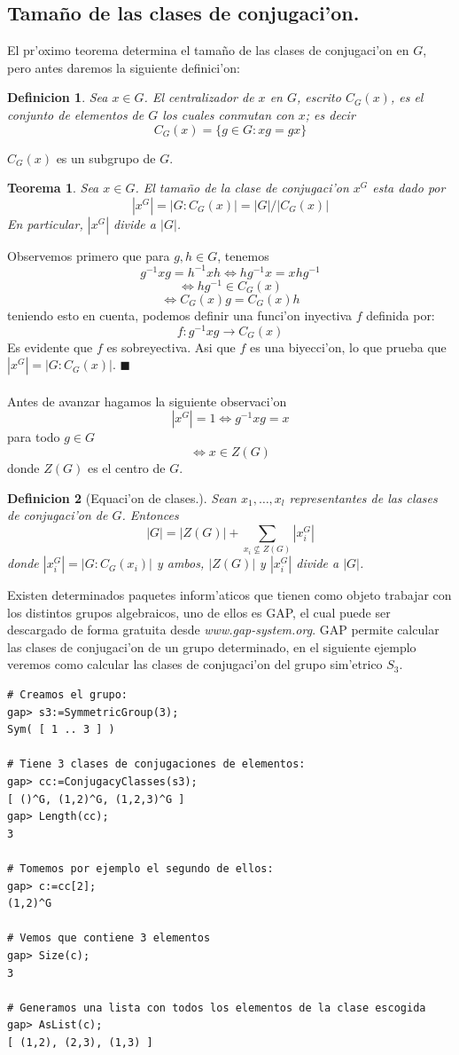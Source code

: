 \documentclass[a4paper,openright,12pt]{book}
\numberwithin{equation}{section} %
\newtheorem{teorema}{Teorema}[section] %
\newtheorem{definicion}{Definicion}[section] %
\newenvironment{proof}{\noindent{\it Demostracion:}}{\hfill$\blacksquare$} %
\begin{document}
\subsection{Tama\~no de las clases de conjugaci'on.}
El pr'oximo teorema determina el tama\~no de las clases de conjugaci'on en $G$, pero antes daremos la siguiente definici'on:
\begin{definicion}
Sea $x \in G$. El centralizador de $x$ en $G$, escrito $C_{G}(x)$, es el conjunto de elementos de $G$ los cuales conmutan con $x$; es decir
\[
C_{G}(x)=\{ g \in G: xg=gx \}
\]
\end{definicion}
$C_{G}(x)$ es un subgrupo de $G$.
\begin{teorema}
Sea $x \in G$. El tama\~no de la clase de conjugaci'on $x^{G}$ esta dado por
\[
|x^{G}|=|G:C_{G}(x)|=|G|/|C_{G}(x)|
\]
En particular, $|x^{G}|$ divide a $|G|$.
\end{teorema}
\begin{proof}
Observemos primero que para $g,h \in G$, tenemos
\[
g^{-1}xg=h^{-1}xh \Leftrightarrow hg^{-1}x=xhg^{-1}
\]
\[
\Leftrightarrow hg^{-1} \in C_{G}(x)
\]
\[
\Leftrightarrow C_{G}(x)g=C_{G}(x)h
\]
teniendo esto en cuenta, podemos definir una funci'on inyectiva $f$ definida por:
\[
f:g^{-1}xg \rightarrow C_{G}(x)
\]
Es evidente que $f$ es sobreyectiva. Asi que $f$ es una biyecci'on, lo que prueba que $|x^{G}|=|G:C_{G}(x)|$.
\end{proof}\\
\\
Antes de avanzar hagamos la siguiente observaci'on
\[
|x^{G}|=1 \Leftrightarrow g^{-1}xg=x
\]
para todo $g \in G$
\[
\Leftrightarrow x \in Z(G)
\]
donde $Z(G)$ es el centro de $G$.
\begin{definicion}[Equaci'on de clases.]
Sean $x_{1}, \ldots ,x_{l}$ representantes de las clases de conjugaci'on de $G$. Entonces
\[
|G|=|Z(G)|+\sum_{x_{i} \nsubseteq Z(G)}|x_{i}^{G}|
\]
donde $|x_{i}^{G}|=|G:C_{G}(x_{i})|$ y ambos, $|Z(G)|$ y $|x_{i}^{G}|$ divide a $|G|$.
\end{definicion}
Existen determinados paquetes inform'aticos que tienen como objeto trabajar con los distintos grupos algebraicos, uno de ellos es GAP, el cual puede ser descargado de forma gratuita desde \emph{www.gap-system.org}. GAP permite calcular las clases de conjugaci'on de un grupo determinado, en el siguiente ejemplo veremos como calcular las clases de conjugaci'on del grupo sim'etrico $S_{3}$. 
\begin{verbatim}
# Creamos el grupo:
gap> s3:=SymmetricGroup(3);
Sym( [ 1 .. 3 ] )

# Tiene 3 clases de conjugaciones de elementos:
gap> cc:=ConjugacyClasses(s3);
[ ()^G, (1,2)^G, (1,2,3)^G ]
gap> Length(cc);
3

# Tomemos por ejemplo el segundo de ellos:
gap> c:=cc[2];
(1,2)^G

# Vemos que contiene 3 elementos
gap> Size(c);
3

# Generamos una lista con todos los elementos de la clase escogida
gap> AsList(c);
[ (1,2), (2,3), (1,3) ]
\end{verbatim}
\end{document}
